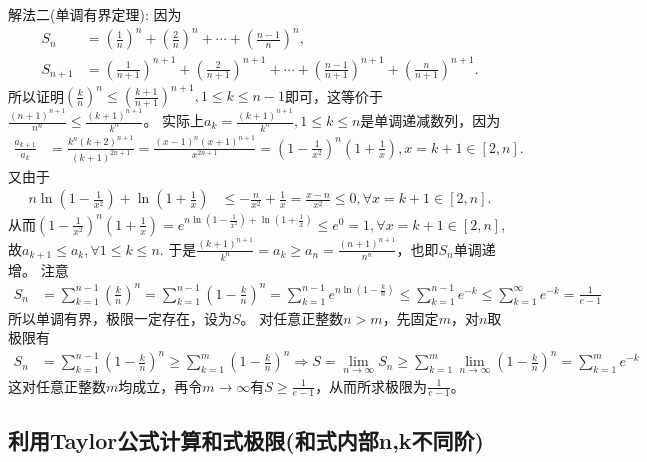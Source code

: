 \documentclass[lang=cn,newtx,10pt,scheme=chinese]{elegantbook}
\begin{document}
\begin{solution}
{\color{blue}解法二(单调有界定理):}
因为
\begin{align*}
S_n&=\left(\frac{1}{n}\right)^n+\left(\frac{2}{n}\right)^n+\cdots+\left(\frac{n - 1}{n}\right)^n,\\
S_{n + 1}&=\left(\frac{1}{n + 1}\right)^{n + 1}+\left(\frac{2}{n + 1}\right)^{n + 1}+\cdots+\left(\frac{n - 1}{n + 1}\right)^{n + 1}+\left(\frac{n}{n + 1}\right)^{n + 1}.
\end{align*}
所以证明\(\left(\frac{k}{n}\right)^n\leq\left(\frac{k + 1}{n + 1}\right)^{n + 1},1\leq k\leq n - 1\)即可，这等价于\(\frac{(n + 1)^{n + 1}}{n^n}\leq\frac{(k + 1)^{n + 1}}{k^n}\)。
实际上\(a_k = \frac{(k + 1)^{n + 1}}{k^n},1\leq k\leq n\)是单调递减数列，因为
\begin{align*}
\frac{a_{k + 1}}{a_k}&=\frac{k^n(k + 2)^{n + 1}}{(k + 1)^{2n + 1}}=\frac{(x - 1)^n(x + 1)^{n + 1}}{x^{2n + 1}}=\left(1-\frac{1}{x^2}\right)^n\left(1+\frac{1}{x}\right),x = k + 1\in[2,n].
\end{align*}
又由于
\begin{align*}
n\ln\left(1-\frac{1}{x^2}\right)+\ln\left(1+\frac{1}{x}\right)&\leq-\frac{n}{x^2}+\frac{1}{x}=\frac{x - n}{x^2}\leq0,\forall x = k + 1\in[2,n].
\end{align*}
从而$\left( 1-\frac{1}{x^2} \right) ^n\left( 1+\frac{1}{x} \right) =e^{n\ln \left( 1-\frac{1}{x^2} \right) +\ln \left( 1+\frac{1}{x} \right)}\leqslant e^0=1,\forall x = k + 1\in[2,n]$,故$a_{k + 1}\leq a_k,\forall 1\leq k\leq n$.
于是\(\frac{(k + 1)^{n + 1}}{k^n}=a_k\geq a_n=\frac{(n + 1)^{n + 1}}{n^n}\)，也即\(S_n\)单调递增。
注意
\begin{align*}
S_n&=\sum_{k = 1}^{n - 1}\left(\frac{k}{n}\right)^n=\sum_{k = 1}^{n - 1}\left(1-\frac{k}{n}\right)^n=\sum_{k = 1}^{n - 1}e^{n\ln\left(1-\frac{k}{n}\right)}\leq\sum_{k = 1}^{n - 1}e^{-k}\leq\sum_{k = 1}^{\infty}e^{-k}=\frac{1}{e - 1}
\end{align*}
所以单调有界，极限一定存在，设为\(S\)。
对任意正整数\(n>m\)，先固定\(m\)，对\(n\)取极限有
\begin{align*}
S_n&=\sum_{k = 1}^{n - 1}\left(1-\frac{k}{n}\right)^n\geq\sum_{k = 1}^{m}\left(1-\frac{k}{n}\right)^n\Rightarrow S=\lim_{n\rightarrow\infty}S_n\geq\sum_{k = 1}^{m}\lim_{n\rightarrow\infty}\left(1-\frac{k}{n}\right)^n=\sum_{k = 1}^{m}e^{-k}
\end{align*}
这对任意正整数\(m\)均成立，再令\(m\rightarrow\infty\)有\(S\geq\frac{1}{e - 1}\)，从而所求极限为\(\frac{1}{e - 1}\)。
\end{solution}


\subsection{利用Taylor公式计算和式极限(和式内部n,k不同阶)}
\end{document}
